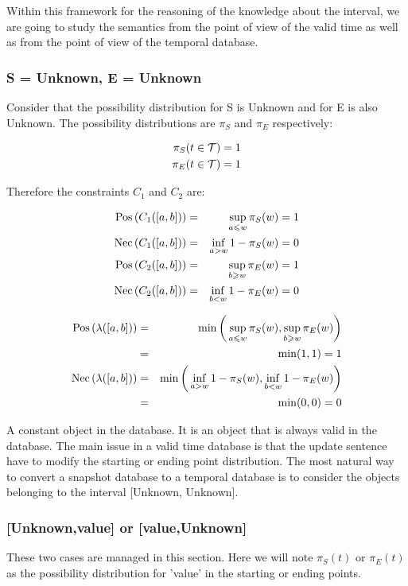 Within this framework for the reasoning of the knowledge about the interval, we are going to study the semantics from the point of view of the valid time as well as from the point of view of the temporal database.

\subsubsection{S = Unknown, E = Unknown}
Consider that the possibility distribution for S is Unknown and for E is also Unknown. The possibility distributions are $\pi_S$ and $\pi_E$ respectively:

\begin{eqnarray}
\pi_{S}(t \in \mathcal{T}) = 1\\
\pi_{E}(t \in \mathcal{T}) = 1
\end{eqnarray}

Therefore the constraints $C_1$ and $C_2$ are:

\begin{eqnarray}
\operatorname{Pos}\left(C_1([a,b])\right) &=& \sup_{a\leqslant w}\pi_{S}(w) = 1\\
\operatorname{Nec}\left(C_1([a,b])\right) &=& \inf_{a>w}1-\pi_{S}(w) = 0\\
\operatorname{Pos}\left(C_2([a,b])\right) &=& \sup_{b\geqslant w}\pi_{E}(w)=1\\
\operatorname{Nec}\left(C_2([a,b])\right) &=& \inf_{b<w}1-\pi_{E}(w)=0
\end{eqnarray}


\begin{eqnarray}
\operatorname{Pos}\left(\lambda([a,b])\right)&=&\min\bigg(\sup_{a\leqslant w}\pi_{S}(w),\sup_{b\geqslant w}\pi_{E}(w)\bigg) \\
&=& \min(1,1)  = 1\\
\operatorname{Nec}\left(\lambda([a,b])\right)&=&\min\bigg(\inf_{a>w}1-\pi_{S}(w),\inf_{b<w}1-\pi_{E}(w)\bigg)\\
&=& \min(0,0) = 0
\end{eqnarray}

\begin{example}
A constant object in the database. It is an object that is always valid in the database.
The main issue in a valid time database is that the update sentence have to modify the starting or ending point distribution. The most natural way to convert a snapshot database to a temporal database is to consider the objects belonging to the interval [Unknown, Unknown].
\end{example}

\subsubsection{[Unknown,value] or [value,Unknown]}
These two cases are managed in this section. Here we will note $\pi_{S}(t)$ or $\pi_{E}(t)$ as the possibility distribution for 'value' in the starting or ending points.


